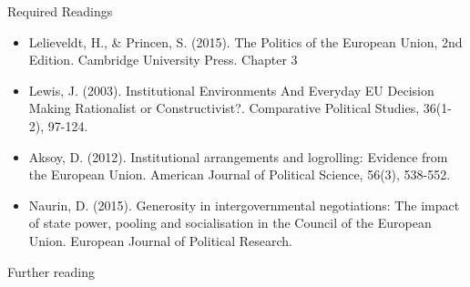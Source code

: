 \noindent Required Readings

\begin{itemize}
	\item Lelieveldt, H., \& Princen, S. (2015). The Politics of the European Union, 2nd Edition. Cambridge University Press. Chapter 3
	\item Lewis, J. (2003). Institutional Environments And Everyday EU Decision Making Rationalist or Constructivist?. Comparative Political Studies, 36(1-2), 97-124.
	\item Aksoy, D. (2012). Institutional arrangements and logrolling: Evidence from the European Union. American Journal of Political Science, 56(3), 538-552.
	\item Naurin, D. (2015). Generosity in intergovernmental negotiations: The impact of state power, pooling and socialisation in the Council of the European Union. European Journal of Political Research.
\end{itemize}	

\noindent Further reading

